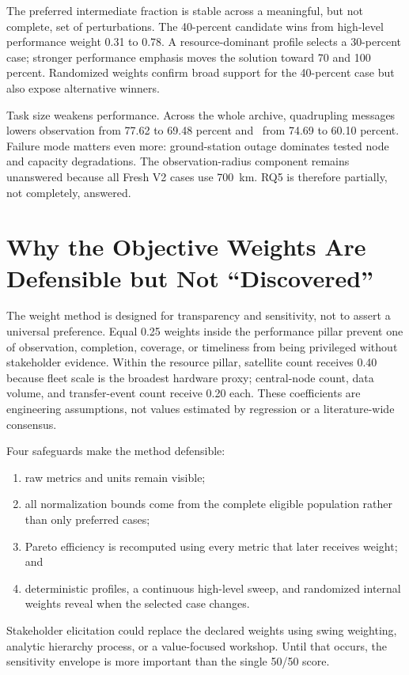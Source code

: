 The preferred intermediate fraction is stable across a meaningful, but not complete, set of perturbations. The 40-percent candidate wins from high-level performance weight 0.31 to 0.78. A resource-dominant profile selects a 30-percent case; stronger performance emphasis moves the solution toward 70 and 100 percent. Randomized weights confirm broad support for the 40-percent case but also expose alternative winners.

Task size weakens performance. Across the whole archive, quadrupling messages lowers observation from 77.62 to 69.48 percent and \Suseful\ from 74.69 to 60.10 percent. Failure mode matters even more: ground-station outage dominates tested node and capacity degradations. The observation-radius component remains unanswered because all Fresh V2 cases use \SI{700}{\kilo\metre}. RQ5 is therefore partially, not completely, answered.

\section{Why the Objective Weights Are Defensible but Not ``Discovered''}

The weight method is designed for transparency and sensitivity, not to assert a universal preference. Equal 0.25 weights inside the performance pillar prevent one of observation, completion, coverage, or timeliness from being privileged without stakeholder evidence. Within the resource pillar, satellite count receives 0.40 because fleet scale is the broadest hardware proxy; central-node count, data volume, and transfer-event count receive 0.20 each. These coefficients are engineering assumptions, not values estimated by regression or a literature-wide consensus.

Four safeguards make the method defensible:

\begin{enumerate}
\item raw metrics and units remain visible;
\item all normalization bounds come from the complete eligible population rather than only preferred cases;
\item Pareto efficiency is recomputed using every metric that later receives weight; and
\item deterministic profiles, a continuous high-level sweep, and randomized internal weights reveal when the selected case changes.
\end{enumerate}

Stakeholder elicitation could replace the declared weights using swing weighting, analytic hierarchy process, or a value-focused workshop. Until that occurs, the sensitivity envelope is more important than the single 50/50 score.

